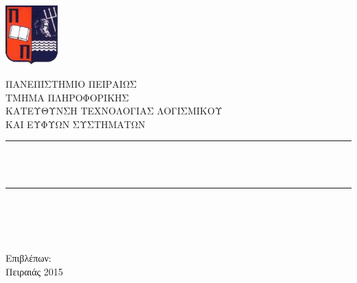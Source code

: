 \begin{titlepage}
\begin{minipage}{0.17\textwidth}
	\includegraphics[width=2cm]{images/logo-unipi.png}
\end{minipage}
\begin{minipage}{0.7\textwidth}
	\begin{flushleft}
		\hspace*{0.5cm}\large ΠΑΝΕΠΙΣΤΗΜΙΟ ΠΕΙΡΑΙΩΣ \normalsize \\
		\hspace*{0.5cm}ΤΜΗΜΑ ΠΛΗΡΟΦΟΡΙΚΗΣ \\
		\hspace*{0.5cm}ΚΑΤΕΥΘΥΝΣΗ ΤΕΧΝΟΛΟΓΙΑΣ ΛΟΓΙΣΜΙΚΟΥ\\
		\hspace*{0.5cm}ΚΑΙ ΕΥΦΥΩΝ ΣΥΣΤΗΜΑΤΩΝ
	\end{flushleft}
\end{minipage}
\begin{center}
	\vspace{1.2in}
	\noindent\rule{15cm}{1.5pt} \\
	\bigskip
	\LARGE{\textbf{\hmwkTitle}}\\
	\noindent\rule{15cm}{1.5pt} \\
	\vspace{0.5in}
	\normalsize{\hmwkType}\\
	\vspace{0.5in}
	\normalsize\textbf{\hmwkAuthorName}\\ \normalsize\textcolor{LightGray}{\hmwkAuthorEmail}\\
	\vspace{3in}
	\normalsize{Επιβλέπων:\ {\hmwkSupervisor}}\\
	\vspace{0.5in}
	\normalsize{Πειραιάς 2015}	
\end{center}

\end{titlepage}
